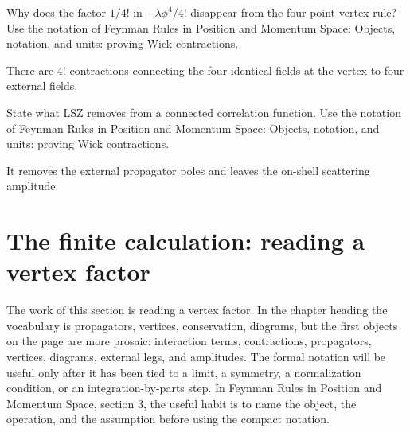 \begin{exercise}
Why does the factor \(1/4!\) in \(-\lambda\phi^4/4!\) disappear from the four-point vertex rule?  Use the notation of Feynman Rules in Position and Momentum Space: Objects, notation, and units: proving Wick contractions.
\begin{answer}
There are \(4!\) contractions connecting the four identical fields at the vertex to four external fields.
\end{answer}
\end{exercise}

\begin{exercise}
State what LSZ removes from a connected correlation function.  Use the notation of Feynman Rules in Position and Momentum Space: Objects, notation, and units: proving Wick contractions.
\begin{answer}
It removes the external propagator poles and leaves the on-shell scattering amplitude.
\end{answer}
\end{exercise}



\section{The finite calculation: reading a vertex factor}













The work of this section is reading a vertex factor.  In the chapter heading the vocabulary is propagators, vertices, conservation, diagrams, but the first objects on the page are more prosaic: interaction terms, contractions, propagators, vertices, diagrams, external legs, and amplitudes.  The formal notation will be useful only after it has been tied to a limit, a symmetry, a normalization condition, or an integration-by-parts step.  In Feynman Rules in Position and Momentum Space, section 3, the useful habit is to name the object, the operation, and the assumption before using the compact notation.

